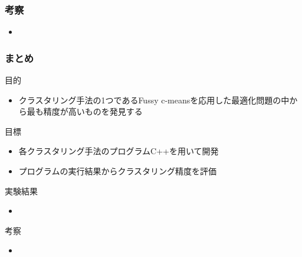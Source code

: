 \documentclass[13pt,dvipdfmx]{beamer}
\begin{document}
\begin{frame}\frametitle{考察}
\begin{itemize}
\item 
\end{itemize}
\end{frame}

\begin{frame}\frametitle{まとめ}
  \begin{block}{目的}
    \begin{itemize}
    \item クラスタリング手法の1つであるFussy c-meansを応用した最適化問題の中から最も精度が高いものを発見する
    \end{itemize}
  \end{block}
  \begin{block}{目標}
    \begin{itemize}
    \item 各クラスタリング手法のプログラムC++を用いて開発
    \item プログラムの実行結果からクラスタリング精度を評価
    \end{itemize}
  \end{block}
  \begin{block}{実験結果}
    \begin{itemize}
    \item 
    \end{itemize}
  \end{block}
  \begin{block}{考察}
      \begin{itemize}
    \item 
    \end{itemize}
  \end{block}
\end{frame}
\end{document}

